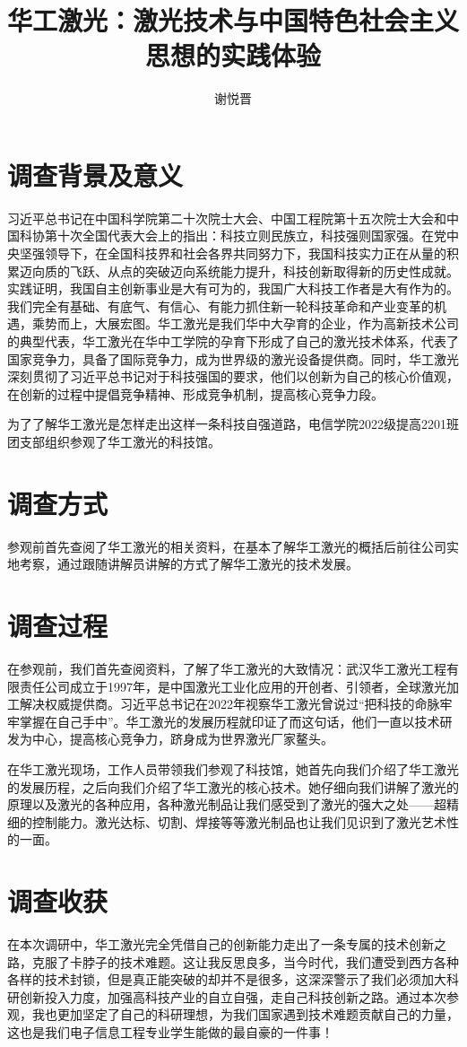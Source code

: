 \documentclass[a4paper,11pt,UTF8]{article}
\title{华工激光：激光技术与中国特色社会主义思想的实践体验}
\author{谢悦晋}
\date{}
\begin{document}
\maketitle
\section{调查背景及意义}
习近平总书记在中国科学院第二十次院士大会、中国工程院第十五次院士大会和中国科协第十次全国代表大会上的指出：科技立则民族立，科技强则国家强。在党中央坚强领导下，在全国科技界和社会各界共同努力下，我国科技实力正在从量的积累迈向质的飞跃、从点的突破迈向系统能力提升，科技创新取得新的历史性成就。实践证明，我国自主创新事业是大有可为的，我国广大科技工作者是大有作为的。我们完全有基础、有底气、有信心、有能力抓住新一轮科技革命和产业变革的机遇，乘势而上，大展宏图。华工激光是我们华中大孕育的企业，作为高新技术公司的典型代表，华工激光在华中工学院的孕育下形成了自己的激光技术体系，代表了国家竞争力，具备了国际竞争力，成为世界级的激光设备提供商。同时，华工激光深刻贯彻了习近平总书记对于科技强国的要求，他们以创新为自己的核心价值观，在创新的过程中提倡竞争精神、形成竞争机制，提高核心竞争力段。

为了了解华工激光是怎样走出这样一条科技自强道路，电信学院2022级提高2201班团支部组织参观了华工激光的科技馆。
\section{调查方式}
参观前首先查阅了华工激光的相关资料，在基本了解华工激光的概括后前往公司实地考察，通过跟随讲解员讲解的方式了解华工激光的技术发展。
\section{调查过程}
在参观前，我们首先查阅资料，了解了华工激光的大致情况：武汉华工激光工程有限责任公司成立于1997年，是中国激光工业化应用的开创者、引领者，全球激光加工解决权威提供商。习近平总书记在2022年视察华工激光曾说过“把科技的命脉牢牢掌握在自己手中”。华工激光的发展历程就印证了而这句话，他们一直以技术研发为中心，提高核心竞争力，跻身成为世界激光厂家鳌头。

在华工激光现场，工作人员带领我们参观了科技馆，她首先向我们介绍了华工激光的发展历程，之后向我们介绍了华工激光的核心技术。她仔细向我们讲解了激光的原理以及激光的各种应用，各种激光制品让我们感受到了激光的强大之处——超精细的控制能力。激光达标、切割、焊接等等激光制品也让我们见识到了激光艺术性的一面。

\section{调查收获}
在本次调研中，华工激光完全凭借自己的创新能力走出了一条专属的技术创新之路，克服了卡脖子的技术难题。这让我反思良多，当今时代，我们遭受到西方各种各样的技术封锁，但是真正能突破的却并不是很多，这深深警示了我们必须加大科研创新投入力度，加强高科技产业的自立自强，走自己科技创新之路。通过本次参观，我也更加坚定了自己的科研理想，为我们国家遇到技术难题贡献自己的力量，这也是我们电子信息工程专业学生能做的最自豪的一件事！
\end{document}
